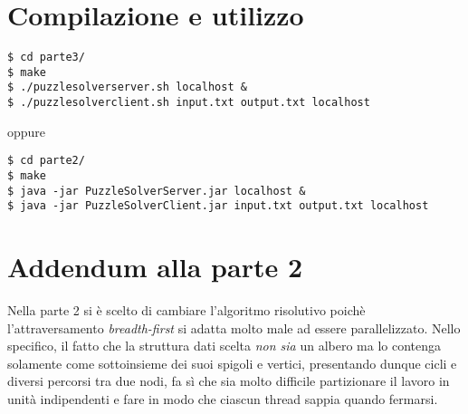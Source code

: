 \documentclass[a4paper]{article}
\begin{document}
\section{Compilazione e utilizzo}
\begin{verbatim}
$ cd parte3/ 
$ make
$ ./puzzlesolverserver.sh localhost &
$ ./puzzlesolverclient.sh input.txt output.txt localhost
\end{verbatim}
oppure
\begin{verbatim}
$ cd parte2/ 
$ make
$ java -jar PuzzleSolverServer.jar localhost &
$ java -jar PuzzleSolverClient.jar input.txt output.txt localhost
\end{verbatim}

% 
\appendix
\section{Addendum alla parte 2}
Nella parte 2 si \`e scelto di cambiare l'algoritmo risolutivo poich\`e l'attraversamento \emph{breadth-first} si adatta molto male ad essere parallelizzato.
Nello specifico, il fatto che la struttura dati scelta \emph{non sia} un albero ma lo contenga solamente come sottoinsieme dei suoi spigoli e vertici, presentando dunque cicli e diversi percorsi tra due nodi, fa s\`i che sia molto difficile partizionare il lavoro in unit\`a indipendenti e fare in modo che ciascun thread sappia quando fermarsi.
\end{document}
